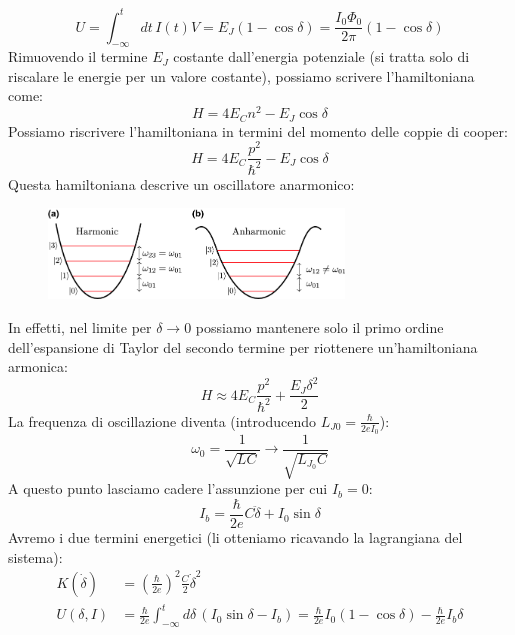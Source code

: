 \begin{equation*}
    U = \int^t_{-\infty} dt\, I(t) V = E_J ( 1 -\cos \delta) = \frac{I_0 \Phi_0}{2\pi}(1-\cos \delta)
\end{equation*}
Rimuovendo il termine $E_J$ costante dall'energia potenziale (si tratta solo di riscalare le energie per un valore costante), possiamo scrivere l'hamiltoniana come:
\begin{equation*}
     H = 4E_C  n^2 - E_J \cos  \delta
\end{equation*}
Possiamo riscrivere l'hamiltoniana in termini del momento delle coppie di cooper:
\begin{equation*}
     H = 4E_C \frac{ p^2}{\hbar^2}- E_J \cos{\delta}
\end{equation*}
Questa hamiltoniana descrive un oscillatore anarmonico:
\begin{figure}[!h]
    \centering
    \includegraphics[width=0.7\textwidth]{images/hanarmonicity.png}
\end{figure}
\newline
In effetti, nel limite per $\delta \rightarrow 0$ possiamo mantenere solo il primo ordine dell'espansione di Taylor del secondo termine per riottenere un'hamiltoniana armonica:
\begin{equation*}
     H \approx 4 E_C \frac{ p^2}{\hbar ^ 2} + \frac{E_J \delta^2}{2}
\end{equation*}
La frequenza di oscillazione diventa (introducendo $L_{J0} = \frac{\hbar}{2eI_0}$):
\begin{equation*}
    \omega_0 = \frac{1}{\sqrt{LC}}\longrightarrow \frac{1}{\sqrt{L_{J_0}C}}
\end{equation*}
A questo punto lasciamo cadere l'assunzione per cui $I_b=0$:
\begin{equation*}
    I_b = \frac{\hbar}{2e}C\ddot \delta + I_0 \sin \delta 
\end{equation*}
Avremo i due termini energetici (li otteniamo ricavando la lagrangiana del sistema):
\begin{align*}
    K (\dot \delta) &= \left( \frac{\hbar}{2e}\right)^2 \frac{C}{2}\dot \delta ^ 2  \\
    U ( \delta, I ) &= \frac{\hbar }{2e}\int^t _{-\infty} d\delta\, (I_0 \sin \delta - I_b)  = \frac{\hbar}{2e} I_0 (1-\cos\delta ) - \frac{\hbar}{2e}I_b\delta
\end{align*}
